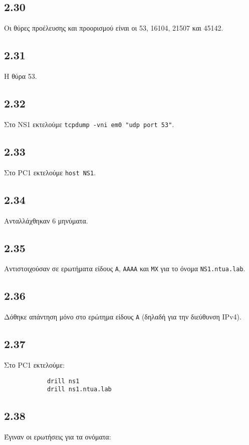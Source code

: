 \documentclass[a4paper, 12pt]{article}
\begin{document}
	\subsection*{2.30}
		Οι θύρες προέλευσης και προορισμού είναι οι 53, 16104, 21507 και 45142.

	\subsection*{2.31}
		Η θύρα 53.

	\subsection*{2.32}
		Στο NS1 εκτελούμε \verb|tcpdump -vni em0 "udp port 53"|.

	\subsection*{2.33}
		Στο PC1 εκτελούμε \verb|host NS1|.

	\subsection*{2.34}
		Ανταλλάχθηκαν 6 μηνύματα.

	\subsection*{2.35}
		Αντιστοιχούσαν σε ερωτήματα είδους \verb|A|, \verb|AAAA| και \verb|MX| για το όνομα \verb|NS1.ntua.lab|.

	\subsection*{2.36}
		Δόθηκε απάντηση μόνο στο ερώτημα είδους \verb|A| (δηλαδή για την διεύθυνση IPv4).

	\subsection*{2.37}
		Στο PC1 εκτελούμε:
		
		\begin{verbatim}
			drill ns1
			drill ns1.ntua.lab
		\end{verbatim}

	\subsection*{2.38}
		Έγιναν οι ερωτήσεις για τα ονόματα:
		
\end{document}
